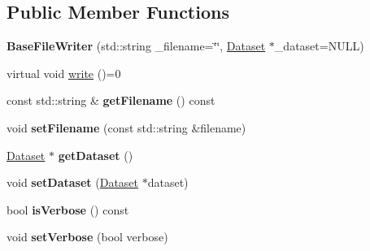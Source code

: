 \subsection*{Public Member Functions}
\begin{DoxyCompactItemize}
\item 
\hypertarget{classffactory_1_1_base_file_writer_a7abb233f705afbab3d6489df2510af52}{{\bfseries Base\-File\-Writer} (std\-::string \-\_\-filename=\char`\"{}\char`\"{}, \hyperlink{classffactory_1_1_dataset}{Dataset} $\ast$\-\_\-dataset=N\-U\-L\-L)}\label{classffactory_1_1_base_file_writer_a7abb233f705afbab3d6489df2510af52}

\item 
virtual void \hyperlink{classffactory_1_1_base_file_writer_a0674ebc35d7448fe40abead0057eb572}{write} ()=0
\item 
\hypertarget{classffactory_1_1_base_file_writer_a3f7621e653029b7674b84017e4eef869}{const std\-::string \& {\bfseries get\-Filename} () const }\label{classffactory_1_1_base_file_writer_a3f7621e653029b7674b84017e4eef869}

\item 
\hypertarget{classffactory_1_1_base_file_writer_addfae383869d69f91dc733511ce909e9}{void {\bfseries set\-Filename} (const std\-::string \&filename)}\label{classffactory_1_1_base_file_writer_addfae383869d69f91dc733511ce909e9}

\item 
\hypertarget{classffactory_1_1_base_file_writer_aaad3fee6d59733f098cac6dca2c64909}{\hyperlink{classffactory_1_1_dataset}{Dataset} $\ast$ {\bfseries get\-Dataset} ()}\label{classffactory_1_1_base_file_writer_aaad3fee6d59733f098cac6dca2c64909}

\item 
\hypertarget{classffactory_1_1_base_file_writer_ae86a7535ddf3fb98b21783bde855fea1}{void {\bfseries set\-Dataset} (\hyperlink{classffactory_1_1_dataset}{Dataset} $\ast$dataset)}\label{classffactory_1_1_base_file_writer_ae86a7535ddf3fb98b21783bde855fea1}

\item 
\hypertarget{classffactory_1_1_base_file_writer_a3db9b3039917a7c42774d51e8611ae23}{bool {\bfseries is\-Verbose} () const }\label{classffactory_1_1_base_file_writer_a3db9b3039917a7c42774d51e8611ae23}

\item 
\hypertarget{classffactory_1_1_base_file_writer_a23974bf4188af26cfc5bb67d57522f2d}{void {\bfseries set\-Verbose} (bool verbose)}\label{classffactory_1_1_base_file_writer_a23974bf4188af26cfc5bb67d57522f2d}

\end{DoxyCompactItemize}
